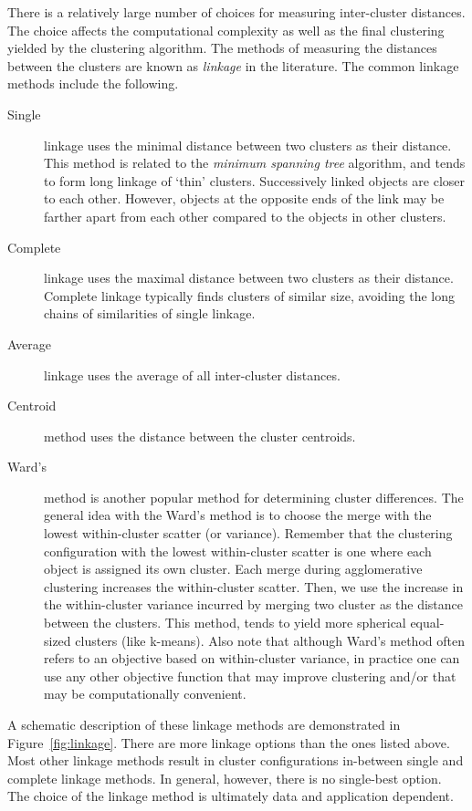 There is a relatively large number of choices
for measuring inter-cluster distances.
The choice affects the computational complexity as well as
the final clustering yielded by the clustering algorithm.
The methods of measuring
the distances between the clusters are known as \emph{linkage}
in the literature.
The common linkage methods include the following.
\begin{description}
  \item[Single] linkage uses the minimal distance
    between two clusters as their distance.
    This method is related to the \emph{minimum spanning tree} algorithm,
    and tends to form long linkage of `thin' clusters.
    Successively linked objects are closer to each other.
    However, objects at the opposite ends of the link may be farther
    apart from each other compared to the objects in other clusters.
  \item[Complete] linkage uses the maximal distance
    between two clusters as their distance.
    Complete linkage typically finds clusters of similar size,
    avoiding the long chains of similarities of single linkage.
  \item[Average] linkage uses the average of
    all inter-cluster distances.
  \item[Centroid] method uses the distance between the cluster centroids.
  \item[Ward's] method is another popular method
    for determining cluster differences.
    The general idea with the Ward's method is to choose
    the merge with the lowest within-cluster scatter (or variance).
    Remember that the clustering configuration with the lowest 
    within-cluster scatter is one where each object is assigned its own cluster.
    Each merge during agglomerative clustering increases
    the within-cluster scatter.
    Then, we use the increase in the within-cluster variance incurred
    by merging two cluster as the distance between the clusters.
    This method, tends to yield more spherical equal-sized clusters
    (like k-means).
    Also note that although Ward's method often refers to an objective
    based on within-cluster variance,
    in practice one can use any other objective function
    that may improve clustering and/or that may be computationally convenient.
\end{description}

A schematic description of these linkage methods are demonstrated
in Figure~\ref{fig:linkage}.
There are more linkage options than the ones listed above.
Most other linkage methods result in cluster configurations in-between
single and complete linkage methods.
In general, however, there is no single-best option.
The choice of the linkage method is ultimately data and application dependent.

